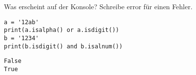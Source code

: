 \question[2] Was erscheint auf der Konsole? Schreibe error für einen Fehler.
\begin{lstlisting}
a = '12ab'
print(a.isalpha() or a.isdigit())
b = '1234'
print(b.isdigit() and b.isalnum())
\end{lstlisting}
\begin{solutionbox}{2cm}
\begin{lstlisting}
False
True
\end{lstlisting}
\end{solutionbox}
